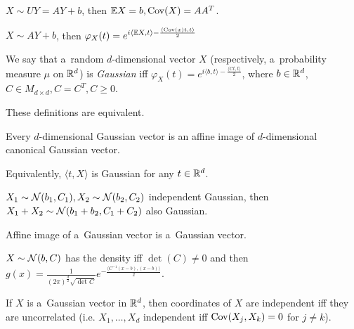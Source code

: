 	\begin{remark}
		$X \sim UY = AY + b$, then $\mathbb{E} X = b, \mathrm{Cov}(X) = A A^T$.
	\end{remark}
	
	\begin{remark}
		$X \sim AY + b$, then $\displaystyle \varphi_X(t) = e^{i \langle \mathbb{E} X, t \rangle - \frac{\langle \mathrm{Cov}(x)t, t \rangle}{2}}$
	\end{remark}
	
	\begin{definition}
		We say that a~random $d$-dimensional vector $X$ (respectively, a~probability measure $\mu$ on $\mathbb{R}^d$) is \emph{Gaussian} iff $\displaystyle \varphi_X(t) = e^{i \langle b,t \rangle - \frac{ \langle Ct, t\rangle }{2}}$, where $b \in \mathbb{R}^d$, ${C \in M_{d \times d}}, C = C^T, C \geq 0$.
	\end{definition}
	
	\begin{proposition}
		These definitions are equivalent.
	\end{proposition}
	
	\begin{corollary}
		Every $d$-dimensional Gaussian vector is an affine image of $d$-dimensional canonical Gaussian vector.
	\end{corollary}
	
	\begin{remark}
		Equivalently, $\langle t, X\rangle$ is Gaussian for any $t \in \mathbb{R}^d$.
	\end{remark}
	
	\begin{corollary}
		$X_1 \sim \mathcal{N}(b_1, C_1), X_2 \sim \mathcal{N}(b_2, C_2)$ independent Gaussian, then $X_1+X_2 \sim \mathcal{N}(b_1 + b_2, C_1 + C_2)$ also Gaussian.
	\end{corollary}
	
	\begin{corollary}
		Affine image of a~Gaussian vector is a~Gaussian vector.
	\end{corollary}
	
	\begin{remark}
		$X \sim \mathcal{N}(b, C)$ has the density iff $\det(C) \neq 0$ and then $\displaystyle g(x) = \frac{1}{(2 \pi)^{\frac{d}{2}} \sqrt{\det C}} e^{-\frac{\langle C^{-1} (x-b), (x-b)\rangle}{2}}.$
	\end{remark}
	
	\begin{theorem}
		If $X$ is a~Gaussian vector in $\mathbb{R}^d$, then coordinates of $X$ are independent iff they are uncorrelated (i.e. $X_1, \ldots, X_d$ independent iff $\mathrm{Cov}(X_j, X_k) = 0 $ for $j\neq k$).
	\end{theorem}
	
